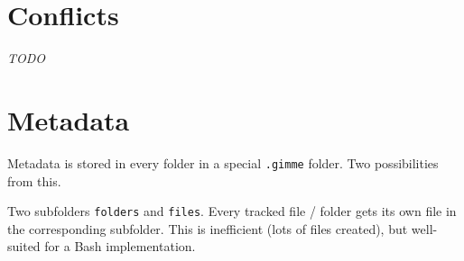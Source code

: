 \documentclass[10pt,a4paper]{article}
\begin{document}
\begin{table}
	\caption{\rmfile{} mechanism for files. In case of conflicts, keep file and print warning}
\end{table}

\begin{table}
	\caption{\rmfile{} mechanism for folders. In case of conflicts, keep folder and print warning}
\end{table}

\section{Conflicts}

\textit{TODO}

\section{Metadata}

\newcommand{\unix}[1]{\texttt{#1}}

Metadata is stored in every folder in a special \unix{.gimme} folder. Two possibilities from this.

Two subfolders \unix{folders} and \unix{files}. Every tracked file / folder gets its own file in the corresponding subfolder. This is inefficient (lots of files created), but well-suited for a Bash implementation.
\end{document}
